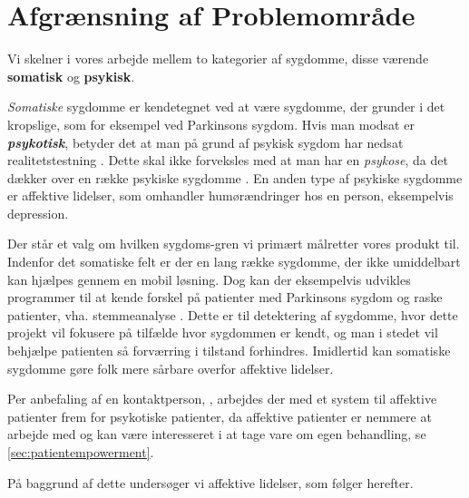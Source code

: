 \section{Afgrænsning af Problemområde}
Vi skelner i vores arbejde mellem to kategorier af sygdomme, disse værende \textbf{somatisk} og \textbf{psykisk}.

\textit{Somatiske} sygdomme er kendetegnet ved at være sygdomme, der grunder i det kropslige, som for eksempel ved Parkinsons sygdom.
Hvis man modsat er \textbf{\textit{psykotisk}}, betyder det at man på grund af psykisk sygdom har nedsat realitetstestning \citep{misc:netpsykpsykose}.
Dette skal ikke forveksles med at man har en \textit{psykose}, da det dækker over en række psykiske sygdomme \citep{misc:netpsykpsykose}.
En anden type af psykiske sygdomme er affektive lidelser, som omhandler humørændringer hos en person, eksempelvis depression.

Der står et valg om hvilken sygdoms-gren vi primært målretter vores produkt til.
Indenfor det somatiske felt er der en lang række sygdomme, der ikke umiddelbart kan hjælpes gennem en mobil løsning.
Dog kan der eksempelvis udvikles programmer til at kende forskel på patienter med Parkinsons sygdom og raske patienter, vha. stemmeanalyse \citep{6168572}.
Dette er til detektering af sygdomme, hvor dette projekt vil fokusere på tilfælde hvor sygdommen er kendt, og man i stedet vil behjælpe patienten så forværring i tilstand forhindres.
Imidlertid kan somatiske sygdomme gøre folk mere sårbare overfor affektive lidelser.

Per anbefaling af en kontaktperson, \citet{misc:janne-rasmussen}, arbejdes der med et system til affektive patienter frem for psykotiske patienter, da affektive patienter er nemmere at arbejde med og kan være interesseret i at tage vare om egen behandling, se \cref{sec:patientempowerment}.

På baggrund af dette undersøger vi affektive lidelser, som følger herefter.

